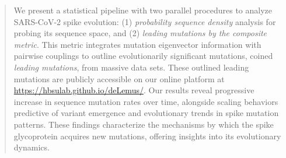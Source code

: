 \documentclass[%
 reprint,
superscriptaddress,
 amsmath,amssymb,
 aps,
]{revtex4-2}
\begin{document}
\begin{abstract}

    We present a statistical pipeline with two parallel procedures to analyze SARS-CoV-2 spike evolution: (1) \textit{probability sequence density} analysis for probing its sequence space, and (2) \textit{leading mutations by the composite metric}. This metric integrates mutation eigenvector information with pairwise couplings to outline evolutionarily significant mutations, coined \textit{leading mutations}, from massive data sets. These outlined leading mutations are publicly accessible on our online platform at \href{https://hbsulab.github.io/deLemus/}{https://hbsulab.github.io/deLemus/}. Our results reveal progressive increase in sequence mutation rates over time, alongside scaling behaviors predictive of variant emergence and evolutionary trends in spike mutation patterns. These findings characterize the mechanisms by which the spike glycoprotein acquires new mutations, offering insights into its evolutionary dynamics.
    

\end{abstract}

\maketitle
\end{document}
